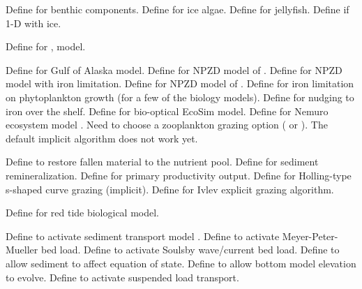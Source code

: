 \begin{klist}
\begin{klist}
\begin{klist}
       Define for benthic components.
       Define for ice algae.
       Define for jellyfish.
       Define if 1-D with ice.
    \end{klist}
     Define for \citet{Xiu_2014},
  \citet{Xiu_2012} model.
    \begin{klist}
    \end{klist}
     Define for
    \citet{Hinckley_2009} Gulf of Alaska model.
     Define for NPZD model of \citet{Franks_86}.
     Define for NPZD model with iron limitation.
     Define for NPZD model of \citet{Powell_2006}.
     Define for iron limitation on phytoplankton
    growth (for a few of the biology models).
     Define for nudging to iron over the shelf.
     Define for bio-optical EcoSim model.
     Define for Nemuro ecosystem model \citep{Kishi_2007}.
    Need to choose a zooplankton grazing option ( or
    ). The default implicit  algorithm
    does not work yet. 
    \begin{klist}
        Define to restore fallen material to the
       nutrient pool.
        Define for sediment remineralization.
        Define for primary productivity output.
        Define for Holling-type s-shaped curve
       grazing (implicit).
        Define for Ivlev explicit grazing
       algorithm.
    \end{klist}
     Define for red tide biological model.
  \end{klist}
   \mbox{}
  \begin{klist}
     Define to activate sediment transport model
    \citep{Warner_2008}.
     Define to activate Meyer-Peter-Mueller bed load.
     Define to activate Soulsby wave/current
    bed load.
     Define to allow sediment to affect equation of
    state.
     Define to allow bottom model elevation to evolve.
     Define to activate suspended load transport.
  \end{klist}

\end{klist}
